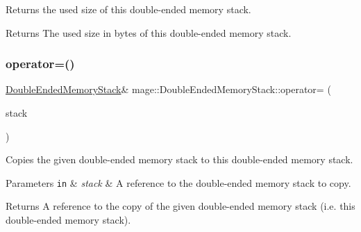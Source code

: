 Returns the used size of this double-\/ended memory stack.

\begin{DoxyReturn}{Returns}
The used size in bytes of this double-\/ended memory stack. 
\end{DoxyReturn}
\mbox{\label{classmage_1_1_double_ended_memory_stack_aafcc4b3cd8d87d75cc3de53994b6ef7e}} 
\subsubsection{\texorpdfstring{operator=()}{operator=()}\hspace{0.1cm}{\footnotesize\ttfamily [1/2]}}
{\footnotesize\ttfamily \mbox{\hyperlink{classmage_1_1_double_ended_memory_stack}{Double\+Ended\+Memory\+Stack}}\& mage\+::\+Double\+Ended\+Memory\+Stack\+::operator= (\begin{DoxyParamCaption}\item[{const \mbox{\hyperlink{classmage_1_1_double_ended_memory_stack}{Double\+Ended\+Memory\+Stack}} \&}]{stack }\end{DoxyParamCaption})\hspace{0.3cm}{\ttfamily [delete]}}

Copies the given double-\/ended memory stack to this double-\/ended memory stack.


\begin{DoxyParams}[1]{Parameters}
\mbox{\tt in}  & {\em stack} & A reference to the double-\/ended memory stack to copy. \\
\hline
\end{DoxyParams}
\begin{DoxyReturn}{Returns}
A reference to the copy of the given double-\/ended memory stack (i.\+e. this double-\/ended memory stack). 
\end{DoxyReturn}
\mbox{\label{classmage_1_1_double_ended_memory_stack_a95b220925f1ef732c104901c3f55015d}} 
